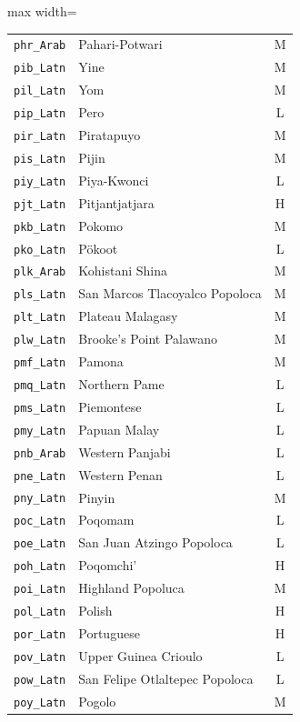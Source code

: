 {\begin{adjustbox}{max width=\textwidth}
\begin{tabular}{llc}
        \texttt{phr\_Arab} & Pahari-Potwari & M \\
        \texttt{pib\_Latn} & Yine & M \\
        \texttt{pil\_Latn} & Yom & M \\
        \texttt{pip\_Latn} & Pero & L \\
        \texttt{pir\_Latn} & Piratapuyo & M \\
        \texttt{pis\_Latn} & Pijin & M \\
        \texttt{piy\_Latn} & Piya-Kwonci & L \\
        \texttt{pjt\_Latn} & Pitjantjatjara & H \\
        \texttt{pkb\_Latn} & Pokomo & M \\
        \texttt{pko\_Latn} & Pökoot & L \\
        \texttt{plk\_Arab} & Kohistani Shina & M \\
        \texttt{pls\_Latn} & San Marcos Tlacoyalco Popoloca & M \\
        \texttt{plt\_Latn} & Plateau Malagasy & M \\
        \texttt{plw\_Latn} & Brooke's Point Palawano & M \\
        \texttt{pmf\_Latn} & Pamona & M \\
        \texttt{pmq\_Latn} & Northern Pame & L \\
        \texttt{pms\_Latn} & Piemontese & L \\
        \texttt{pmy\_Latn} & Papuan Malay & L \\
        \texttt{pnb\_Arab} & Western Panjabi & L \\
        \texttt{pne\_Latn} & Western Penan & L \\
        \texttt{pny\_Latn} & Pinyin & M \\
        \texttt{poc\_Latn} & Poqomam & L \\
        \texttt{poe\_Latn} & San Juan Atzingo Popoloca & L \\
        \texttt{poh\_Latn} & Poqomchi' & H \\
        \texttt{poi\_Latn} & Highland Popoluca & M \\
        \texttt{pol\_Latn} & Polish & H \\
        \texttt{por\_Latn} & Portuguese & H \\
        \texttt{pov\_Latn} & Upper Guinea Crioulo & L \\
        \texttt{pow\_Latn} & San Felipe Otlaltepec Popoloca & L \\
        \texttt{poy\_Latn} & Pogolo & M \\

\end{tabular}
\end{adjustbox}}
